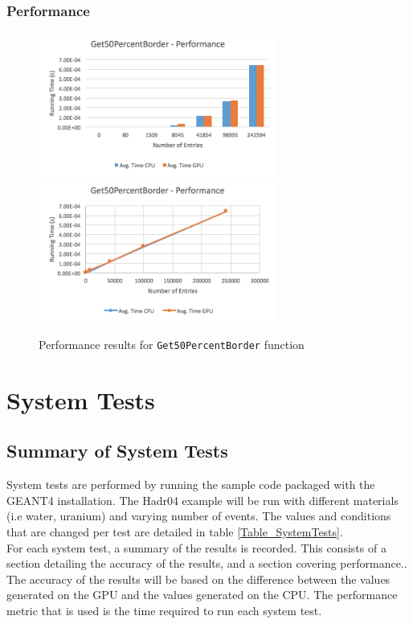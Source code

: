 \documentclass[12pt]{article}
\begin{document}
	\subsubsection{Performance}
		\begin{figure}[H]
    	\centering
    	\caption{Performance results for \texttt{Get50PercentBorder} function}\label{figPerformanceGet50Percent}
    	\includegraphics[width=0.7\textwidth]{get50_bar.png}
    	\includegraphics[width=0.7\textwidth]{get50_line.png}
    	\end{figure}
		
\section{System Tests}
\subsection{Summary of System Tests}
System tests are performed by running the sample code packaged with the GEANT4 installation. The Hadr04 example will be run with different materials (i.e water, uranium) and varying number of events. The values and conditions that are changed per test are detailed in table \ref{Table_SystemTests}.\\

For each system test, a summary of the results is recorded. This consists of a section detailing the accuracy of the results, and a section covering performance.. The accuracy of the results will be based on the difference between the values generated on the GPU and the values generated on the CPU. The performance metric that is used is the time required to run each system test.
\end{document}
